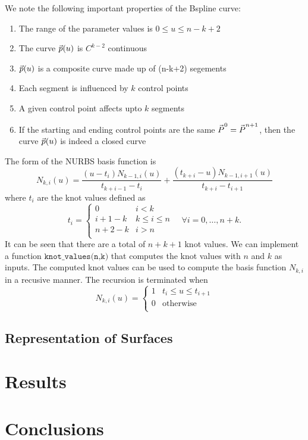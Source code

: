 \documentclass[submit,12pt]{aiaa-pretty} %
\newcommand*{\vv}[1]{\vec{\mkern0mu#1}}
\begin{document}
We note the following important properties of the Bspline curve:
\begin{enumerate}
\item The range of the parameter values is $0 \le u \le n-k+2$
\item The curve $\vv{p}(u)$ is $C^{k-2}$ continuous
\item $\vv{p}(u)$ is a composite curve made up of (n-k+2) segements
\item Each segment is influenced by $k$ control points
\item A given control point affects upto $k$ segments
\item If the starting and ending control points are the same $\vv{P}^0  = \vv{P}^{n+1}$, then the curve $\vv{p}(u)$ is indeed a closed curve
\end{enumerate}
The form of the NURBS basis function is
\begin{equation}
  N_{k,i}(u) = \frac{(u-t_i) N_{k-1,i}(u)}{t_{k+i-1}-t_i} + \frac{(t_{k+i}-u)N_{k-1,i+1}(u)}{t_{k+i}-t_{i+1}}
\end{equation}
where $t_i$ are the knot values defined as 
\begin{equation}
  t_i =
  \begin{cases}
    0 & i < k\\
    i+1 - k & k \le i \le n \\
    n+2 - k & i > n\\ 
  \end{cases}
\quad \forall i = 0,\ldots, n+k.
\end{equation}
It can be seen that there are a total of $n+k+1$ knot values. We can
implement a function $\texttt{knot\_values(n,k)}$ that computes the
knot values with $n$ and $k$ as inputs.  The computed knot values can
be used to compute the basis function $N_{k,i}$ in a recusive manner.
The recursion is terminated when
\begin{equation}
  N_{k,i}(u) = 
  \begin{cases}
    1 & t_i \le u \le t_{i+1}    \\
    0 & \mathrm{otherwise} \\
  \end{cases}
\end{equation}

\subsection{Representation of Surfaces}

\section{Results}

\section{Conclusions}
 
\end{document}
